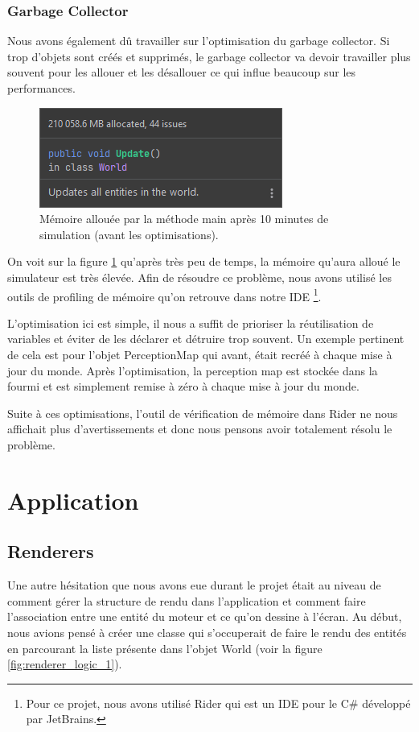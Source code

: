 \documentclass{EPUProjetDi}
\begin{document}
\subsubsection{Garbage Collector}
Nous avons également dû travailler sur l'optimisation du garbage collector. Si trop d'objets sont créés et supprimés, le garbage collector va devoir travailler plus souvent pour les allouer et les désallouer
ce qui influe beaucoup sur les performances.  

\begin{figure}[h]
    \centering
    \includegraphics[scale=1]{garbage_collector.png}
    \caption{Mémoire allouée par la méthode main après 10 minutes de simulation (avant les optimisations).}
    \label{fig:garbage_collector}
\end{figure}

On voit sur la figure \ref{fig:garbage_collector} qu'après très peu de temps, la mémoire qu'aura alloué le simulateur est très élevée.
Afin de résoudre ce problème, nous avons utilisé les outils de profiling de mémoire qu'on retrouve dans notre IDE
\footnote{Pour ce projet, nous avons utilisé Rider qui est un IDE pour le C\# développé par JetBrains.}.

L'optimisation ici est simple, il nous a suffit de prioriser la réutilisation de variables et éviter de les déclarer et détruire trop souvent.
Un exemple pertinent de cela est pour l'objet PerceptionMap qui avant, était recréé à chaque mise à jour du monde. Après l'optimisation, la perception map est stockée dans la fourmi
et est simplement remise à zéro à chaque mise à jour du monde. 

Suite à ces optimisations, l'outil de vérification de mémoire dans Rider ne nous affichait plus d'avertissements et donc nous pensons avoir totalement résolu le problème.

\section{Application}

\subsection{Renderers}
Une autre hésitation que nous avons eue durant le projet était au niveau de comment gérer la structure de rendu dans l'application et comment 
faire l'association entre une entité du moteur et ce qu'on dessine à l'écran. Au début, nous avions pensé à créer une classe qui s'occuperait de faire le rendu des
entités en parcourant la liste présente dans l'objet World (voir la figure \ref{fig:renderer_logic_1}). 
\end{document}
